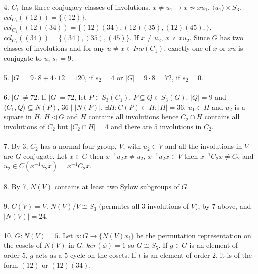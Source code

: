 4.
$C_1$ has three conjugacy classes of involutions.  $x \ne u_1 \rightarrow x \nsim x u_1$.
$ \langle u_1 \rangle \times S_3$. 
$ccl_{C_1}((12))= \{ (12) \}$,
$ccl_{C_1}((12)(34))= \{ 
(12)(34), 
(12)(35), 
(12)(45), 
\}$, $ccl_{C_1}((34))= \{ (34) , (35), (45) \}$.  If $x \ne u_2$, $ x \nsim x u_2$.
Since $G$ has two classes of involutions and for any $u \ne x \in Inv(C_1 )$,
exactly one of $x$  or $xu$ is
conjugate to $u$, $s_1 = 9$.
\\
\\
5.
$|G|= 9 \cdot 8 + 4 \cdot 12 = 120$, if $s_2=4$ or $|G|= 9 \cdot 8 = 72$, if $s_2 = 0$.
\\
\\
6. $|G| \ne 72$: If $|G|=72$, let
$P \in S_3(C_1)$, $P \subseteq Q \in S_3(G)$.  
$|Q|=9$ and $ \langle C_1 , Q \rangle \subseteq N(P)$,
$36 \mid |N(P)|$.
$\exists H: C(P) \subset H: |H|=36$.  $u_1 \in H$ and $u_2$ is a square in $H$.
$H \lhd G$ and $H$ contains all involutions hence $C_2 \cap H$ contains all involutions of
$C_2$ but $|C_2 \cap H|=4$ and there are $5$ involutions in $C_2$.
\\
\\
7. By 3, $C_2$ has a normal four-group, $V$, with $u_2 \in V$ and all the involutions
in $V$ are $G$-conjugate.
Let $x \in G$ then $x^{-1} u_2 x \ne u_2$, $x^{-1} u_2 x \in V$ then
$x^{-1} C_2 x \ne C_2$ and
$u_2 \in C(x^{-1} u_2 x) = x^{-1} C_2 x$.
\\
\\
8. By 7, $N(V)$ contains at least two Sylow subgroups of $G$.
\\
\\
9.  $C(V)=V$.
$N(V)/V \cong S_3$ (permutes all $3$ involutions of $V$), by 7 above, and $|N(V)|= 24$.
\\
\\
10. $G:N(V)= 5$. Let $\phi: G \rightarrow \{N(V)x_i\}$ be the permutation representation
on the cosets of $N(V)$ in $G$.  $ker(\phi) = 1$ so $G \cong S_5$.
If $g \in G$ is an element
of order $5$, $g$ acts as a $5$-cycle on the cosets.  If $t$ is an element of order $2$,
it is of the form $(12)$ or $(12)(34)$.
